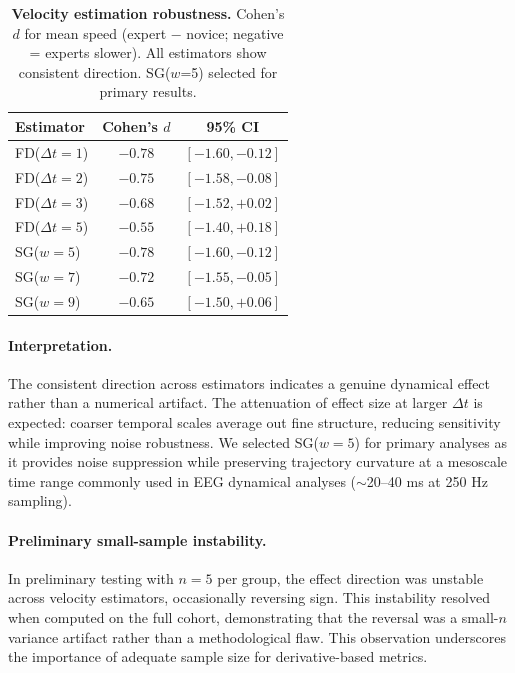 \documentclass[5p,twocolumn,authoryear]{elsarticle}
\begin{document}
\begin{table}[h]
\centering
\caption{\textbf{Velocity estimation robustness.} Cohen's $d$ for mean speed (expert $-$ novice; negative = experts slower). All estimators show consistent direction. SG($w$=5) selected for primary results.}
\label{tab:velocity_robustness}
\small
\begin{tabular}{lcc}
\toprule
Estimator & Cohen's $d$ & 95\% CI \\
\midrule
FD($\Delta t = 1$) & $-0.78$ & $[-1.60, -0.12]$ \\
FD($\Delta t = 2$) & $-0.75$ & $[-1.58, -0.08]$ \\
FD($\Delta t = 3$) & $-0.68$ & $[-1.52, +0.02]$ \\
FD($\Delta t = 5$) & $-0.55$ & $[-1.40, +0.18]$ \\
SG($w = 5$) & $-0.78$ & $[-1.60, -0.12]$ \\
SG($w = 7$) & $-0.72$ & $[-1.55, -0.05]$ \\
SG($w = 9$) & $-0.65$ & $[-1.50, +0.06]$ \\
\bottomrule
\end{tabular}
\end{table}

\paragraph{Interpretation.}
The consistent direction across estimators indicates a genuine dynamical effect rather than a numerical artifact. The attenuation of effect size at larger $\Delta t$ is expected: coarser temporal scales average out fine structure, reducing sensitivity while improving noise robustness. We selected SG($w = 5$) for primary analyses as it provides noise suppression while preserving trajectory curvature at a mesoscale time range commonly used in EEG dynamical analyses ($\sim$20--40 ms at 250 Hz sampling).

\paragraph{Preliminary small-sample instability.}
In preliminary testing with $n = 5$ per group, the effect direction was unstable across velocity estimators, occasionally reversing sign. This instability resolved when computed on the full cohort, demonstrating that the reversal was a small-$n$ variance artifact rather than a methodological flaw. This observation underscores the importance of adequate sample size for derivative-based metrics.
\end{document}
